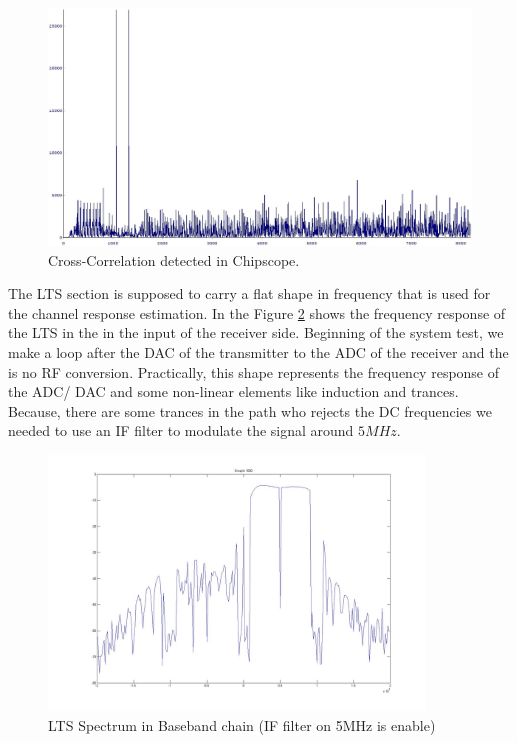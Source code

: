 \begin{figure}
\centering
\includegraphics[width=\textwidth]{content/fig/crosscorr.JPG}
\caption{Cross-Correlation detected in Chipscope.}
\label{fig:crosscorr}
\end{figure}

The LTS section is supposed to carry a flat shape in frequency that is used for the channel response estimation. In the Figure \ref{fig:baseIFAdcDac} shows the frequency response of the LTS in the in the input of the receiver side. Beginning of the system test, we make a loop after the DAC of the transmitter to the ADC of the receiver and the is no RF conversion. Practically, this shape represents the frequency response of the ADC/ DAC and some non-linear elements like induction and trances. Because, there are some trances in the path who rejects the DC frequencies we needed to use an IF filter to modulate the signal around $5 MHz$.\\

\begin{figure}
\centering
\includegraphics[width=10cm]{content/fig/baseIFAdcDac.JPG}
\caption{LTS Spectrum in Baseband chain (IF filter on 5MHz is enable)}
\label{fig:baseIFAdcDac}
\end{figure}

